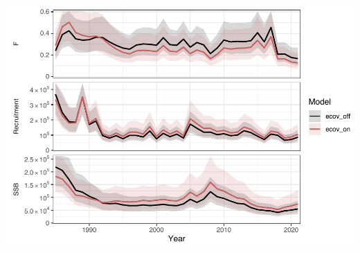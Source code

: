 \documentclass[
]{article}
\let\origfigure\figure
\let\endorigfigure\endfigure
\renewenvironment{figure}[1][2] {
    \expandafter\origfigure\expandafter[H]
} {
    \endorigfigure
}
\begin{document}
\begin{figure}
\centering
\includegraphics{Bluefish_forageindex_CJFAS_files/figure-latex/WHAMcomp-1.pdf}
\caption{\label{fig:WHAMcomp}Bluefish assessment results with (ecov\_on) and without (ecov\_off) the fall StateWaters forage index as a catchabilty covariate on recreational fishery catch per unit effort. Estimated fishing mortality (F, top), recruitment (center), and spawning stock biomass (SSB, bottom).}
\end{figure}
\end{document}

